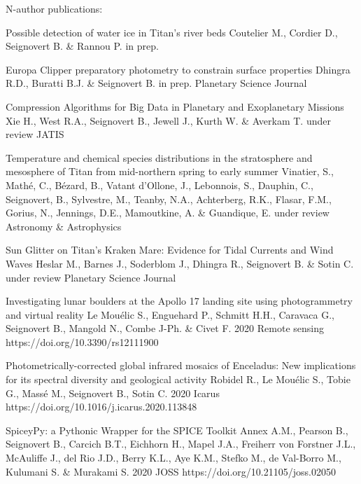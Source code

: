 \begin{cvpublications}{N-author publications:}

	{Possible detection of water ice in Titan's river beds}
	{Coutelier M., Cordier D., Seignovert B. \& Rannou P.}
    {in prep.}
	{}
    {}

	{Europa Clipper preparatory photometry to constrain surface properties}
	{Dhingra R.D., Buratti B.J. \& Seignovert B.}
    {in prep.}
	{Planetary Science Journal}
    {}

	{Compression Algorithms for Big Data in Planetary and Exoplanetary Missions}
	{Xie H., West R.A., Seignovert B., Jewell J., Kurth W. \& Averkam T.}
    {under review}
	{JATIS}
    {}

	{Temperature and chemical species distributions in the stratosphere and mesosphere of Titan from mid-northern spring to early summer}
	{Vinatier, S., Mathé, C., Bézard, B., Vatant d’Ollone, J., Lebonnois, S., Dauphin, C., Seignovert, B., Sylvestre, M., Teanby, N.A., Achterberg, R.K., Flasar, F.M., Gorius, N., Jennings, D.E., Mamoutkine, A. \& Guandique, E.}
    {under review}
	{Astronomy \& Astrophysics}
    {}

	{Sun Glitter on Titan's Kraken Mare: Evidence for Tidal Currents and Wind Waves}
	{Heslar M., Barnes J., Soderblom J., Dhingra R., Seignovert B. \& Sotin C.}
	{under review}
    {Planetary Science Journal}
    {}

	{Investigating lunar boulders at the Apollo 17 landing site using photogrammetry and virtual reality}
	{Le Mouélic S., Enguehard P., Schmitt H.H., Caravaca G., Seignovert B., Mangold N., Combe J-Ph. \& Civet F.}
	{2020}
    {Remote sensing}
    {https://doi.org/10.3390/rs12111900}

	{Photometrically-corrected global infrared mosaics of Enceladus: New implications for its spectral diversity and geological activity}
	{Robidel R., Le Mouélic S., Tobie  G., Massé M., Seignovert B., Sotin C.}
	{2020}
    {Icarus}
    {https://doi.org/10.1016/j.icarus.2020.113848}

	{SpiceyPy: a Pythonic Wrapper for the SPICE Toolkit}
	{Annex A.M., Pearson B., Seignovert B., Carcich B.T., Eichhorn H., Mapel J.A., Freiherr von Forstner J.L., McAuliffe J., del Rio J.D., Berry K.L., Aye K.M., Stefko M., de Val-Borro M., Kulumani S. \& Murakami S.}
	{2020}
    {JOSS}
    {https://doi.org/10.21105/joss.02050}


\end{cvpublications}
